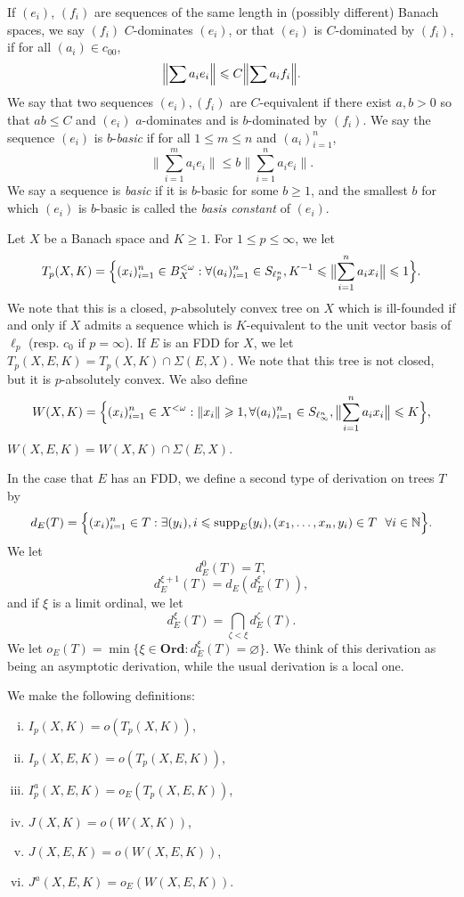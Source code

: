 \documentclass[12pt]{amsart}
\theoremstyle{definition}
\newcommand{\ord}{\textbf{Ord}}
\newcommand{\nn}{\mathbb{N}}
\newcommand{\supp}{\mathrm{supp}}
\begin{document}
If $(e_i)$, $(f_i)$ are sequences of the same length in (possibly different) Banach spaces, we say $(f_i)$ $C$-dominates $(e_i)$, or that $(e_i)$ is $C$-dominated by $(f_i)$, if for all $(a_i)\in c_{00}$, $$\Bigl\|\sum a_ie_i\Bigr\| \leqslant C\Bigl\|\sum a_i f_i\Bigr\|.$$  We say that two sequences $(e_i), (f_i)$ are $C$-equivalent if there exist $a,b>0$ so that $ab\leqslant C$ and $(e_i)$ $a$-dominates and is $b$-dominated by $(f_i)$.  We say the sequence $(e_i)$ is $b$-\emph{basic} if for all $1\leqslant m\leqslant n$ and $(a_i)_{i=1}^n$, $$\bigl\|\sum_{i=1}^m a_ie_i\bigr\|\leqslant b\bigl\|\sum_{i=1}^n a_ie_i\bigr\|.$$  We say a sequence is \emph{basic} if it is $b$-basic for some $b\geqslant 1$, and the smallest $b$ for which $(e_i)$ is $b$-basic is called the \emph{basis constant} of $(e_i)$.  








Let $X$ be a Banach space and $K\geqslant 1$.  For $1\leqslant p\leqslant \infty$, we let $$T_p(X, K)=\Bigl\{(x_i)_{i=1}^n\in B_X^{<\omega}: \forall (a_i)_{i=1}^n \in S_{\ell_p^n}, K^{-1}\leqslant \bigl\|\sum_{i=1}^n a_ix_i\bigr\|\leqslant 1\Bigr\}.$$  We note that this is a closed, $p$-absolutely convex tree on $X$ which is ill-founded if and only if $X$ admits a sequence which is $K$-equivalent to the unit vector basis of $\ell_p$ (resp. $c_0$ if $p=\infty$).  If $E$ is an FDD for $X$, we let $T_p(X, E, K)=T_p(X, K)\cap \Sigma(E, X)$. We note that this tree is not closed, but it is $p$-absolutely convex.  We also define $$W(X,K)=\Bigl\{(x_i)_{i=1}^n\in X^{<\omega}: \|x_i\|\geqslant 1, \forall (a_i)_{i=1}^n\in S_{\ell_\infty^n}, \bigl\|\sum_{i=1}^n a_ix_i\bigr\|\leqslant K\Bigr\},$$  $W(X, E, K)=W(X,K)\cap \Sigma(E, X)$.  

In the case that $E$ has an FDD, we define a second type of derivation on trees $T$ by $$d_E(T)=\Bigl\{(x_i)_{i=1}^n\in T: \exists (y_i), i\leqslant \supp_E(y_i), (x_1, \ldots, x_n, y_i)\in T \text{\ \ }\forall i\in \nn\Bigr\}.$$  We let $$d_E^0(T)=T,$$ $$d_E^{\xi+1}(T)=d_E(d^\xi_E(T)),$$ and if $\xi$ is a limit ordinal, we let $$d^\xi_E(T)=\bigcap_{\zeta<\xi} d^\zeta_E(T).$$  We let $o_E(T)=\min \{\xi\in \ord: d_E^\xi(T)=\varnothing\}$.  We think of this derivation as being an asymptotic derivation, while the usual derivation is a local one.  

We make the following definitions: \begin{enumerate}[(i)]\item $I_p(X,K)=o(T_p(X,K))$, \item $I_p(X,E,K)=o(T_p(X,E,K))$, \item $I^a_p(X,E,K)=o_E(T_p(X,E,K))$, \item $J(X,K)=o(W(X,K))$, \item $J(X,E,K)=o(W(X,E,K))$, \item $J^a(X, E, K)=o_E(W(X, E, K))$. \end{enumerate}
\end{document}
